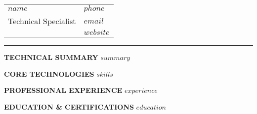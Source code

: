 \documentclass[10pt,a4paper]{article}
\begin{document}
\pagestyle{empty}

\noindent
\begin{tabular}{p{} p{}}
{\huge\bfseries\color{techblue} $name$} & \raggedleft $phone$ \\
{\large Technical Specialist} & \raggedleft $email$ \\
& \raggedleft $website$ \\
\end{tabular}

\vspace{0.5em}
\noindent\rule{\textwidth}{2pt}

\vspace{0.5em}
\textbf{\color{techblue} TECHNICAL SUMMARY}
$summary$

\vspace{0.5em}
\textbf{\color{techblue} CORE TECHNOLOGIES}
$skills$

\vspace{0.5em}
\textbf{\color{techblue} PROFESSIONAL EXPERIENCE}
$experience$

\vspace{0.5em}
\textbf{\color{techblue} EDUCATION \& CERTIFICATIONS}
$education$
\end{document}
